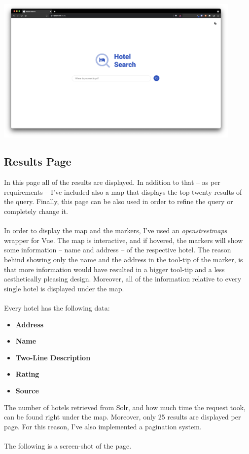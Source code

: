 \documentclass[unicode,11pt,a4paper,oneside,numbers=endperiod,openany]{scrartcl}
\begin{document}
\begin{center}
	\includegraphics[width=12cm]{./main.png}
\end{center}

\subsection{Results Page}
In this page all of the results are displayed. In addition to that -- as per requirements -- I've included also a map that displays the top twenty results of the query. Finally, this page can be also used in order to refine the query or completely change it. \\ \\
In order to display the map and the markers, I've used an \textit{openstreetmaps} wrapper for Vue. The map is interactive, and if hovered, the markers will show some information -- name and address -- of the respective hotel. The reason behind showing only the name and the address in the tool-tip of the marker, is that more information would have resulted in a bigger tool-tip and a less aesthetically pleasing design. Moreover, all of the information relative to every single hotel is displayed under the map. \\ \\
Every hotel has the following data:

\begin{itemize}
	\item \textbf{Address}
	\item \textbf{Name}
	\item \textbf{Two-Line Description}
	\item \textbf{Rating}
	\item \textbf{Source}
\end{itemize}
The number of hotels retrieved from Solr, and how much time the request took, can be found right under the map. Moreover, only 25 results are displayed per page. For this reason, I've also implemented a pagination system. \\ \\
The following is a screen-shot of the page.
\end{document}

